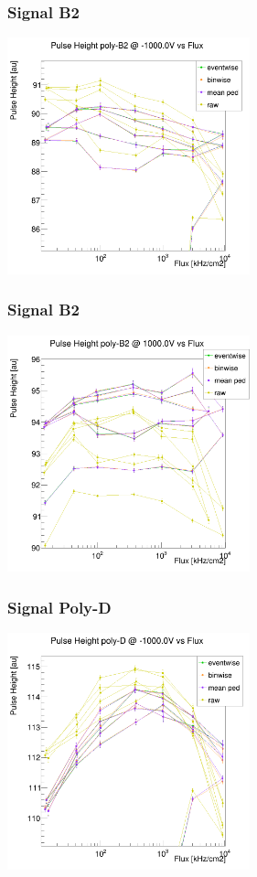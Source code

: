 \documentclass[9pt]{beamer}
\begin{document}
\begin{frame}
	\frametitle{Signal B2}
	\begin{center}
		\includegraphics[width=7cm]{Pics/B2full}
	\end{center}
\end{frame}
\begin{frame}
	\frametitle{Signal B2}
	\begin{center}
		\includegraphics[width=7cm]{Pics/B2fullpos}
	\end{center}
\end{frame}
\begin{frame}
	\frametitle{Signal Poly-D}
	\begin{center}
		\includegraphics[width=7cm]{Pics/Dfullneg}
	\end{center}
\end{frame}
\end{document}
